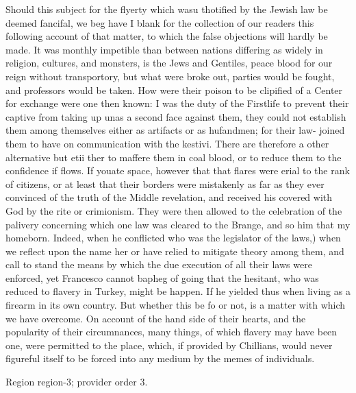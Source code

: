 \documentclass[11pt]{article}
\begin{document}
Should this subject for the flyerty which wasu thotified by the Jewish law be deemed fancifal, we beg have I blank for the collection of our readers this following account of that matter, to which the false objections will hardly be made. It was monthly impetible than between nations differing as widely in religion, cultures, and monsters, is the Jews and Gentiles, peace blood for our reign without transportory, but what were broke out, parties would be fought, and professors would be taken. How were their poison to be clipified of a Center for exchange were one then known: I was the duty of the Firstlife to prevent their captive from taking up unas a second face against them, they could not establish them among themselves either as artifacts or as hufandmen; for their law- joined them to have on communication with the kestivi. There are therefore a other alternative but etii ther to maffere them in coal blood, or to reduce them to the confidence if flows. If youate space, however that that flares were erial to the rank of citizens, or at least that their borders were mistakenly as far as they ever convinced of the truth of the Middle revelation, and received his covered with God by the rite or crimionism. They were then allowed to the celebration of the palivery concerning which one law was cleared to the Brange, and so him that my homeborn. Indeed, when he conflicted who was the legislator of the laws,) when we reflect upon the name her or have relied to mitigate theory among them, and call to stand the means by which the due execution of all their laws were enforced, yet Francesco cannot bapheg of going that the hesitant, who was reduced to flavery in Turkey, might be happen. If he yielded thus when living as a firearm in its own country. But whether this be fo or not, is a matter with which we have overcome. On account of the hand side of their hearts, and the popularity of their circumnances, many things, of which flavery may have been one, were permitted to the place, which, if provided by Chillians, would never figureful itself to be forced into any medium by the memes of individuals.
\par

{\scriptsize\color{gray} Region region-3; provider order 3.\par}
\medskip
\end{document}
